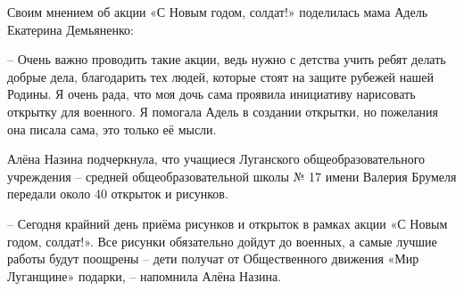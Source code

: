 Своим мнением об акции «С Новым годом, солдат!» поделилась мама Адель Екатерина
Демьяненко:

– Очень важно проводить такие акции, ведь нужно с детства учить ребят делать
добрые дела, благодарить тех людей, которые стоят на защите рубежей нашей
Родины. Я очень рада, что моя дочь сама проявила инициативу нарисовать открытку
для военного. Я помогала Адель в создании открытки, но пожелания она писала
сама, это только её мысли.

Алёна Назина подчеркнула, что учащиеся Луганского общеобразовательного
учреждения – средней общеобразовательной школы № 17 имени Валерия Брумеля
передали около 40 открыток и рисунков.

– Сегодня крайний день приёма рисунков и открыток в рамках акции «С Новым
годом, солдат!». Все рисунки обязательно дойдут до военных, а самые лучшие
работы будут поощрены – дети получат от Общественного движения «Мир Луганщине»
подарки, – напомнила Алёна Назина.
